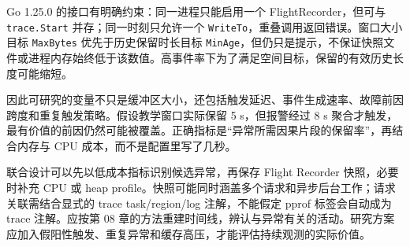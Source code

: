 \documentclass[UTF8,fontset=fandol,openany,11pt]{ctexbook}
\begin{document}
Go 1.25.0 的接口有明确约束：同一进程只能启用一个 FlightRecorder，但可与 \texttt{trace.\allowbreak{}Start} 并存；同一时刻只允许一个 \texttt{WriteTo}，重叠调用返回错误。窗口大小目标 \texttt{MaxBytes} 优先于历史保留时长目标 \texttt{MinAge}，但仍只是提示，不保证快照文件或进程内存始终低于该数值。高事件率下为了满足空间目标，保留的有效历史长度可能缩短。

因此可研究的变量不只是缓冲区大小，还包括触发延迟、事件生成速率、故障前因跨度和重复触发策略。假设教学窗口实际保留 5 s，但报警经过 8 s 聚合才触发，最有价值的前因仍然可能被覆盖。正确指标是“异常所需因果片段的保留率”，再结合内存与 CPU 成本，而不是配置里写了几秒。

联合设计可以先以低成本指标识别候选异常，再保存 Flight Recorder 快照，必要时补充 CPU 或 heap profile。快照可能同时涵盖多个请求和异步后台工作；请求关联需结合显式的 trace task/region/log 注解，不能假定 pprof 标签会自动成为 trace 注解。应按第 08 章的方法重建时间线，辨认与异常有关的活动。研究方案应加入假阳性触发、重复异常和缓存高压，才能评估持续观测的实际价值。
\end{document}
